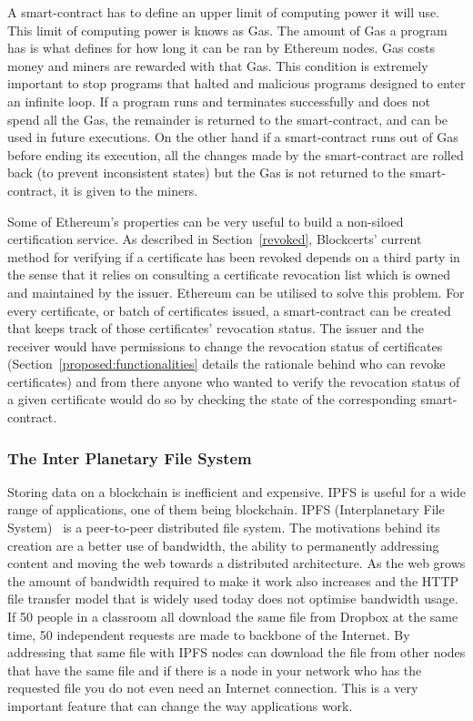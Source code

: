 \documentclass[letterpaper,twocolumn,10pt]{article}
\begin{document}
A smart-contract has to define an upper limit of computing power it will use. This limit of computing power is knows as Gas. The amount of Gas a program has is what defines for how long it can be ran by Ethereum nodes. Gas costs money and miners are rewarded with that Gas. This condition is extremely important to stop programs that halted and malicious programs designed to enter an infinite loop. If a program runs and terminates successfully and does not spend all the Gas, the remainder is returned to the smart-contract, and can be used in future executions. On the other hand if a smart-contract runs out of Gas before ending its execution, all the changes made by the smart-contract are rolled back (to prevent inconsistent states) but the Gas is not returned to the smart-contract, it is given to the miners.

Some of Ethereum's properties can be very useful to build a non-siloed certification service. As described in Section~\ref{revoked}, Blockcerts' current method for verifying if a certificate has been revoked depends on a third party in the sense that it relies on consulting a certificate revocation list which is owned and maintained by the issuer. Ethereum can be utilised to solve this problem. For every certificate, or batch of certificates issued, a smart-contract can be created that keeps track of those certificates' revocation status. The issuer and the receiver would have permissions to change the revocation status of certificates (Section~\ref{proposed:functionalities} details the rationale behind who can revoke certificates) and from there anyone who wanted to verify the revocation status of a given certificate would do so by checking the state of the corresponding smart-contract.


\subsubsection{The Inter Planetary File System}
\label{rel:ipfs}

Storing data on a blockchain is inefficient and expensive. IPFS is useful for a wide range of applications, one of them being blockchain. IPFS (Interplanetary File System)~\cite{Benet:2014vw} is a peer-to-peer distributed file system. The motivations behind its creation are a better use of bandwidth, the ability to permanently addressing content and moving the web towards a distributed architecture.
As the web grows the amount of bandwidth required to make it work also increases and the HTTP %
file transfer model that is widely used today does not optimise bandwidth usage. If 50 people in a classroom all download the same file from Dropbox at the same time, 50 independent requests are made to backbone of the Internet. By addressing that same file with IPFS nodes can download the file from other nodes that have the same file and if there is a node in your network who has the requested file you do not even need an Internet connection. This is a very important feature that can change the way applications work.
\end{document}
